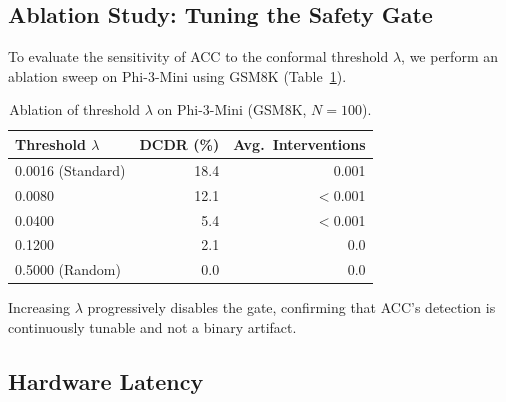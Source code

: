 \documentclass{uai2026}  %
\begin{document}
\subsection{Ablation Study: Tuning the Safety Gate}
\label{subsec:ablation}

To evaluate the sensitivity of ACC to the conformal threshold $\lambda$,
we perform an ablation sweep on Phi-3-Mini using GSM8K (Table~\ref{tab:ablation}).

\begin{table}[htbp]
\centering
\caption{Ablation of threshold $\lambda$ on Phi-3-Mini (GSM8K, $N=100$).}
\label{tab:ablation}
\footnotesize
\begin{tabular}{@{}lrr@{}}
\toprule
\textbf{Threshold} $\lambda$ & \textbf{DCDR (\%)} & \textbf{Avg.\ Interventions} \\
\midrule
0.0016 (Standard) & 18.4 & 0.001 \\
0.0080            & 12.1 & $<$0.001 \\
0.0400            & 5.4  & $<$0.001 \\
0.1200            & 2.1  & 0.0 \\
0.5000 (Random)   & 0.0  & 0.0 \\
\bottomrule
\end{tabular}
\end{table}

Increasing $\lambda$ progressively disables the gate, confirming that
ACC's detection is continuously tunable and not a binary artifact.

\subsection{Hardware Latency}

\begin{table}[htbp]
\centering
\caption{ACC Teacher Handoff Latency Breakdown (per handoff event).}
\label{tab:latency}
\footnotesize
{}
\end{table}
\end{document}
